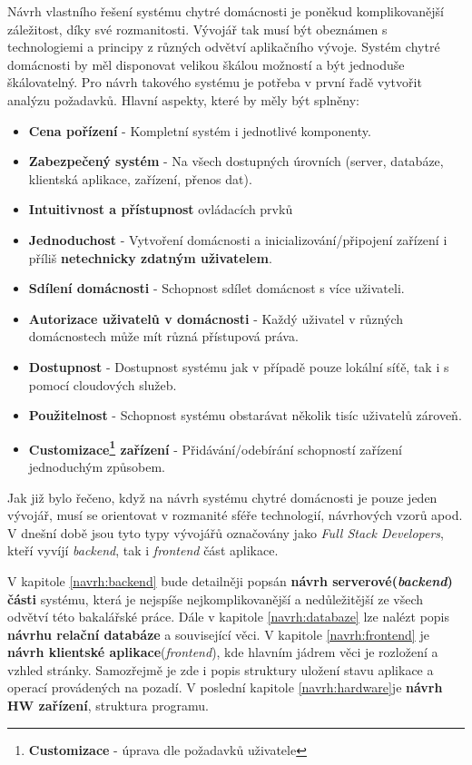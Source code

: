 Návrh vlastního řešení systému chytré domácnosti je poněkud komplikovanější záležitost, díky své rozmanitosti.
Vývojář tak musí být obeznámen s technologiemi a principy z různých odvětví aplikačního vývoje.
Systém chytré domácnosti by měl disponovat velikou škálou možností a být jednoduše škálovatelný.
Pro návrh takového systému je potřeba v první řadě vytvořit analýzu požadavků.
\newline
\newline
Hlavní aspekty, které by měly být splněny:
\begin{itemize}
  \item \textbf{Cena pořízení} - Kompletní systém i jednotlivé komponenty.
  \item \textbf{Zabezpečený systém} - Na všech dostupných úrovních (server, databáze, klientská aplikace, zařízení, přenos dat).
  \item \textbf{Intuitivnost a přístupnost} ovládacích prvků
  \item \textbf{Jednoduchost} - Vytvoření domácnosti a inicializování/připojení zařízení i příliš \textbf{netechnicky zdatným uživatelem}.
  \item \textbf{Sdílení domácnosti} - Schopnost sdílet domácnost s více uživateli.
  \item \textbf{Autorizace uživatelů v domácnosti} - Každý uživatel v různých domácnostech může mít různá přístupová práva.
  \item \textbf{Dostupnost} - Dostupnost systému jak v případě pouze lokální síťě, tak i s pomocí cloudových služeb.
  \item \textbf{Použitelnost} - Schopnost systému obstarávat několik tisíc uživatelů zároveň.
  \item \textbf{Customizace\footnote{\textbf{Customizace} - úprava dle požadavků uživatele} zařízení} - Přidávání/odebírání schopností zařízení jednoduchým způsobem.
\end{itemize}
Jak již bylo řečeno, když na návrh systému chytré domácnosti je pouze jeden vývojář, musí se orientovat v rozmanité sféře technologií, návrhových vzorů apod.
V dnešní době jsou tyto typy vývojářů označovány jako \emph{Full Stack Developers}, kteří vyvíjí \emph{backend}, tak i \emph{frontend} část aplikace.

V kapitole \ref{navrh:backend} bude detailněji popsán \textbf{návrh serverové(\emph{backend}) části} systému, která je nejspíše nejkomplikovanější a nedůležitější ze všech odvětví této bakalářské práce.
Dále v kapitole \ref{navrh:databaze} lze nalézt popis \textbf{návrhu relační databáze} a související věci.
V kapitole \ref{navrh:frontend} je \textbf{návrh klientské aplikace}(\emph{frontend}), kde hlavním jádrem věci je rozložení a vzhled stránky.
Samozřejmě je zde i popis struktury uložení stavu aplikace a operací provádených na pozadí.
V poslední kapitole \ref{navrh:hardware}je \textbf{návrh HW zařízení}, struktura programu.

